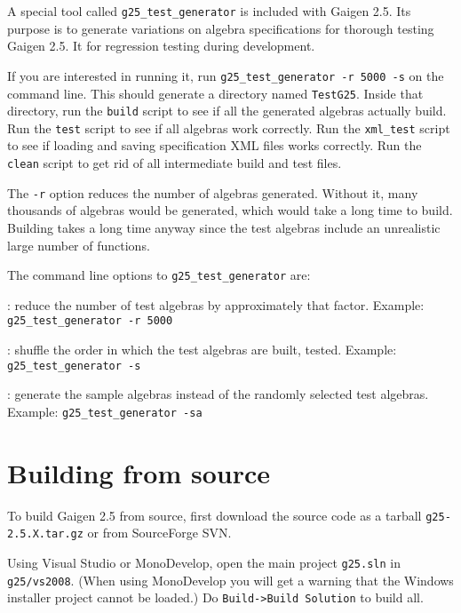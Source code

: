 \documentclass[10pt, a4paper]{article}
\begin{document}
A special tool called {\tt g25\_test\_generator} is included with Gaigen 2.5.
Its purpose is to generate variations on algebra specifications for thorough testing
Gaigen 2.5. It for regression testing during development. 

If you are interested in running it, run {\tt g25\_test\_generator -r 5000 -s} on
the command line.
This should generate a directory named {\tt TestG25}. 
Inside that directory, run the {\tt build} script to see if all the
generated algebras actually build. Run the {\tt test} script to see if
all algebras work correctly. Run the {\tt xml\_test} script to see if
loading and saving specification XML files works correctly.
Run the {\tt clean} script to get rid of all intermediate build and test
files.

The {\tt -r} option reduces the number of algebras generated. Without it,
many thousands of algebras would be generated, which would take a long time to build.
Building takes a long time anyway since the test algebras include an unrealistic
large number of functions.

The command line options to {\tt g25\_test\_generator} are:
\vspace*{2mm}

: reduce the number of test algebras by approximately that factor.
Example: {\tt g25\_test\_generator -r 5000}

\vspace*{2mm}

: shuffle the order in which the test algebras are built, tested.
Example: {\tt g25\_test\_generator -s}

\vspace*{2mm}

: generate the sample algebras instead of the randomly
selected test algebras.
Example: {\tt g25\_test\_generator -sa}

\section{Building from source}

To build Gaigen 2.5 from source, first download the source code as a tarball {\tt g25-2.5.X.tar.gz}
or from SourceForge SVN.

Using Visual Studio or MonoDevelop, open the main project {\tt g25.sln} in {\tt g25/vs2008}.
(When using MonoDevelop you will get a warning that the Windows installer project cannot be loaded.)
Do {\tt Build->Build Solution} to build all. 
\end{document}

